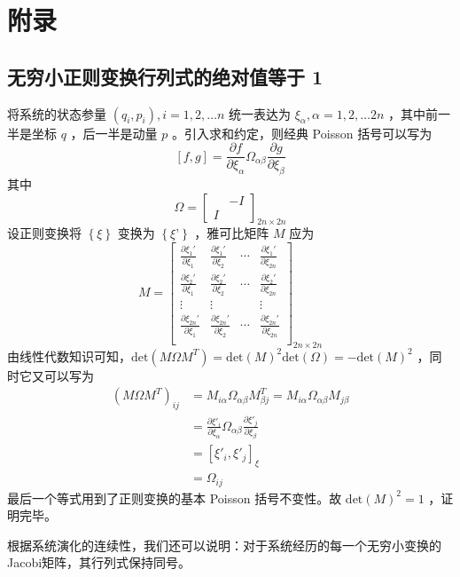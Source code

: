 \documentclass[hyperref,UTF-8]{ctexbook}
\newcommand{\0}{\boldsymbol{0}}
\begin{document}
    
\chapter{附录}
\section{无穷小正则变换行列式的绝对值等于 1}
将系统的状态参量 $(q_i,p_i), i = 1,2,\dots n$ 统一表达为 $\xi_\alpha, \alpha = 1,2,\dots 2n$ ，其中前一半是坐标 $q$ ，后一半是动量 $p$ 。引入求和约定，则经典 Poisson 括号可以写为
\[
    [f, g] = \frac{\partial f}{\partial \xi_\alpha}\Omega_{\alpha\beta}\frac{\partial g}{\partial \xi_\beta}
\]
其中
\[
    \Omega = \begin{bmatrix}
        & -I\\
        I&
    \end{bmatrix}_{2n\times 2n}
\]
设正则变换将 $\left \{ \xi \right \}$ 变换为 $\left \{ \xi’ \right \}$ ，雅可比矩阵 $M$ 应为
\[
    M = \begin{bmatrix}
        \frac{\partial \xi_1'}{\partial \xi_1} & \frac{\partial \xi_1'}{\partial \xi_2} & \cdots  & \frac{\partial \xi_1'}{\partial \xi_{2n}} \\
        \frac{\partial \xi_2'}{\partial \xi_1} & \frac{\partial \xi_2'}{\partial \xi_2} & \cdots  & \frac{\partial \xi_2'}{\partial \xi_{2n}} \\
        \vdots & \vdots &  & \vdots\\
        \frac{\partial \xi_{2n}'}{\partial \xi_1} & \frac{\partial \xi_{2n}'}{\partial \xi_2} & \cdots  & \frac{\partial \xi_{2n}'}{\partial \xi_{2n}} \\
    \end{bmatrix}_{2n\times 2n}
\]
由线性代数知识可知，$\text{det}(M\Omega M^T) = \text{det}(M)^2 \text{det}(\Omega) = - \text{det}(M)^2$ ，同时它又可以写为
\begin{align*}
    (M\Omega M^T)_{ij} &= M_{i\alpha}\Omega_{\alpha\beta}M^T_{\beta j}
    = M_{i\alpha}\Omega_{\alpha\beta}M_{j\beta}\\
    &= \frac{\partial \xi'_i}{\partial \xi_\alpha}\Omega_{\alpha\beta}\frac{\partial \xi'_j}{\partial \xi_\beta}\\
    &= [\xi'_i, \xi'_j]_\xi\\
    &= \Omega_{ij}
\end{align*}
最后一个等式用到了正则变换的基本 Poisson 括号不变性。故 $\text{det}(M)^2 = 1$ ，证明完毕。

根据系统演化的连续性，我们还可以说明：对于系统经历的每一个无穷小变换的Jacobi矩阵，其行列式保持同号。
    
    


\end{document}
